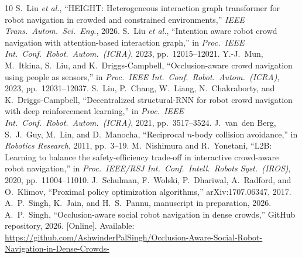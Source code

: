 \documentclass[conference]{IEEEtran}
\begin{document}
\begin{thebibliography}{10}
 S.~Liu \emph{et al.}, ``HEIGHT: Heterogeneous interaction graph transformer for robot navigation in crowded and constrained environments,'' \emph{IEEE Trans.\ Autom.\ Sci.\ Eng.}, 2026.
 S.~Liu \emph{et al.}, ``Intention aware robot crowd navigation with attention-based interaction graph,'' in \emph{Proc.\ IEEE Int.\ Conf.\ Robot.\ Autom.\ (ICRA)}, 2023, pp.~12015--12021.
 Y.-J.~Mun, M.~Itkina, S.~Liu, and K.~Driggs-Campbell, ``Occlusion-aware crowd navigation using people as sensors,'' in \emph{Proc.\ IEEE Int.\ Conf.\ Robot.\ Autom.\ (ICRA)}, 2023, pp.~12031--12037.
 S.~Liu, P.~Chang, W.~Liang, N.~Chakraborty, and K.~Driggs-Campbell, ``Decentralized structural-RNN for robot crowd navigation with deep reinforcement learning,'' in \emph{Proc.\ IEEE Int.\ Conf.\ Robot.\ Autom.\ (ICRA)}, 2021, pp.~3517--3524.
 J.~van~den Berg, S.~J.~Guy, M.~Lin, and D.~Manocha, ``Reciprocal $n$-body collision avoidance,'' in \emph{Robotics Research}, 2011, pp.~3--19.
 M.~Nishimura and R.~Yonetani, ``L2B: Learning to balance the safety-efficiency trade-off in interactive crowd-aware robot navigation,'' in \emph{Proc.\ IEEE/RSJ Int.\ Conf.\ Intell.\ Robots Syst.\ (IROS)}, 2020, pp.~11004--11010.
 J.~Schulman, F.~Wolski, P.~Dhariwal, A.~Radford, and O.~Klimov, ``Proximal policy optimization algorithms,'' arXiv:1707.06347, 2017.
 A.~P.~Singh, K.~Jain, and H.~S.~Pannu, manuscript in preparation, 2026.
 A.~P.~Singh, ``Occlusion-aware social robot navigation in dense crowds,'' GitHub repository, 2026. [Online]. Available: \url{https://github.com/AshwinderPalSingh/Occlusion-Aware-Social-Robot-Navigation-in-Dense-Crowds-}
\end{thebibliography}
\end{document}
